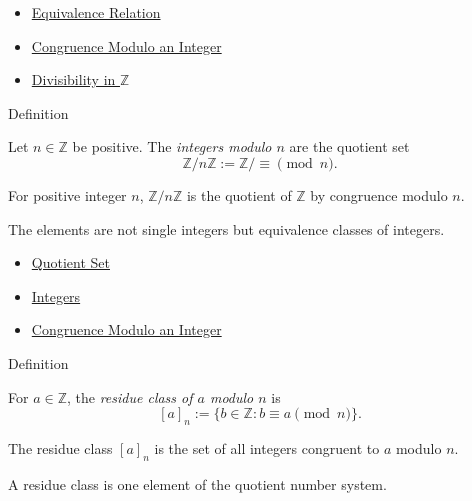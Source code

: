\begin{dependencies}
\begin{itemize}
  \item \hyperref[def:equivalence-relation]{Equivalence Relation}
  \item \hyperref[def:congruence-modulo-integer]{Congruence Modulo an Integer}
  \item \hyperref[def:divisibility-in-z]{Divisibility in \(\mathbb{Z}\)}
\end{itemize}
\end{dependencies}

\begin{definitionbox}{Definition}
\begin{definition}
\label{def:integers-modulo-n}
Let \(n\in\mathbb{Z}\) be positive. The \emph{integers modulo \(n\)} are the
quotient set
\[
\mathbb{Z}/n\mathbb{Z}:=\mathbb{Z}/{\equiv \pmod n}.
\]
\end{definition}

\begin{remark*}
For positive integer \(n\), \(\mathbb{Z}/n\mathbb{Z}\) is the quotient of
\(\mathbb{Z}\) by congruence modulo \(n\).
\end{remark*}

\begin{remark*}[Interpretation]
The elements are not single integers but equivalence classes of integers.
\end{remark*}
\end{definitionbox}

\begin{dependencies}
\begin{itemize}
  \item \hyperref[def:quotient-set]{Quotient Set}
  \item \hyperref[def:integers]{Integers}
  \item \hyperref[def:congruence-modulo-integer]{Congruence Modulo an Integer}
\end{itemize}
\end{dependencies}

\begin{definitionbox}{Definition}
\begin{definition}
\label{def:residue-class-modulo-n}
For \(a\in\mathbb{Z}\), the \emph{residue class of \(a\) modulo \(n\)} is
\[
[a]_n:=\{b\in\mathbb{Z}: b\equiv a\pmod n\}.
\]
\end{definition}

\begin{remark*}
The residue class \([a]_n\) is the set of all integers congruent to \(a\)
modulo \(n\).
\end{remark*}

\begin{remark*}[Interpretation]
A residue class is one element of the quotient number system.
\end{remark*}
\end{definitionbox}

